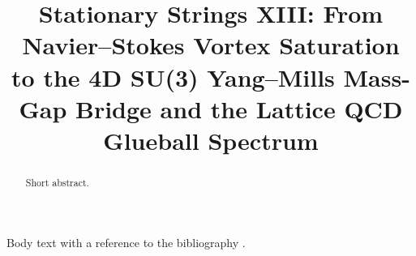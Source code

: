 \documentclass[aps,pre,twocolumn,reprint]{revtex4-2}
\title{Stationary Strings XIII: From Navier--Stokes Vortex Saturation to the 4D SU(3) Yang--Mills Mass-Gap Bridge and the Lattice QCD Glueball Spectrum}
\begin{document}
\begin{abstract}
Short abstract.
\end{abstract}
\maketitle
Body text with a reference to the bibliography \cite{foo}.


\end{document}
